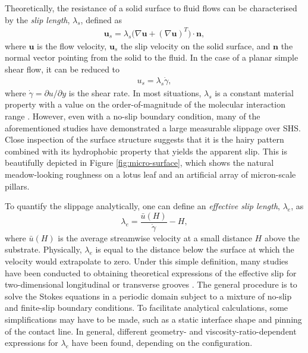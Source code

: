 Theoretically, the resistance of a solid surface to fluid flows can be characterised by the \emph{slip length}, $\lambda_s$, defined as
\begin{equation}
 \begin{aligned}
  \bm{u}_s = \lambda_s \bigg( \nabla {\bm u} + (\nabla {\bm u})^T \bigg) \cdot \bm{n},
 \end{aligned}
\end{equation}
where $\bm{u}$ is the flow velocity, $\bm{u}_s$ the slip velocity on the solid surface, and $\bm n$ the normal vector pointing from the solid to the fluid.
In the case of a planar simple shear flow, it can be reduced to
\begin{equation}
 \begin{aligned}
  u_s = \lambda_s \dot{\gamma},
 \end{aligned}
\end{equation}
where $\dot{\gamma}=\partial u/\partial y$ is the shear rate.
In most situations, $\lambda_s$ is a constant material property with a value on the order-of-magnitude of the molecular interaction range \citep{Thompson_Troian_1997}.
However, even with a no-slip boundary condition, many of the aforementioned studies have demonstrated a large measurable slippage over SHS.
Close inspection of the surface structure suggests that it is the hairy pattern combined with its hydrophobic property that yields the apparent slip.
This is beautifully depicted in Figure \ref{fig:micro-surface}, which shows the natural meadow-looking roughness on a lotus leaf and an artificial array of micron-scale pillars. 

To quantify the slippage analytically, one can define an \emph{effective slip length}, $\lambda_e$, as
\begin{equation} \label{eff slip}
  \lambda_e = \frac{\bar{u}(H)}{\dot{\gamma}}-H,
\end{equation}
where $\bar{u}(H)$ is the average streamwise velocity at a small distance $H$ above the substrate.
Physically, $\lambda_e$ is equal to the distance below the surface at which the velocity would extrapolate to zero.
Under this simple definition, many studies have been conducted to obtaining theoretical expressions of the effective slip for two-dimensional longitudinal or transverse grooves \citep{Lauga_Stone, Sbragalia_Prosperetti, Davis_Lauga, Ng_Wang, Schonecker, Nizkaya, Crowdy_tran, Crowdy_long}.
The general procedure is to solve the Stokes equations in a periodic domain subject to a mixture of no-slip and finite-slip boundary conditions. To facilitate analytical calculations, some simplifications may have to be made, such as a static interface shape and pinning of the contact line.
In general, different geometry- and viscosity-ratio-dependent expressions for $\lambda_e$ have been found, depending on the configuration.

